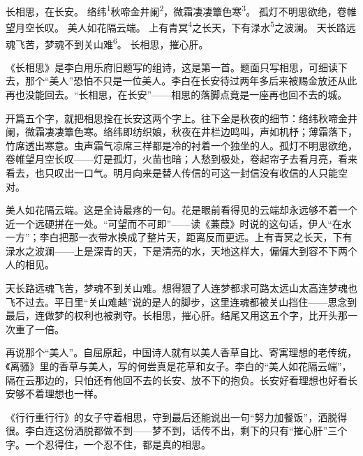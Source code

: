 
\begin{poem}
长相思，在长安。
络纬\textsuperscript{1}秋啼金井阑\textsuperscript{2}，微霜凄凄簟色寒\textsuperscript{3}。
孤灯不明思欲绝，卷帷望月空长叹。
美人如花隔云端。
上有青冥\textsuperscript{4}之长天，下有渌水\textsuperscript{5}之波澜。
天长路远魂飞苦，梦魂不到关山难\textsuperscript{6}。
长相思，摧心肝。
\end{poem}

\begin{annotations}
\end{annotations}

\begin{appreciation}
《长相思》是李白用乐府旧题写的组诗，这是第一首。题面只写相思，可细读下去，那个“美人”恐怕不只是一位美人。李白在长安待过两年多后来被赐金放还从此再也没能回去。“长相思，在长安”——相思的落脚点竟是一座再也回不去的城。

开篇五个字，就把相思拴在长安这两个字上。往下全是秋夜的细节：络纬秋啼金井阑，微霜凄凄簟色寒。络纬即纺织娘，秋夜在井栏边鸣叫，声如机杼；薄霜落下，竹席透出寒意。虫声霜气凉席三样都是冷的衬着一个独坐的人。孤灯不明思欲绝，卷帷望月空长叹——灯是孤灯，火苗也暗；人愁到极处，卷起帘子去看月亮，看来看去，也只叹出一口气。明月向来是替人传信的可这一封信没有收信的人只能空对。

美人如花隔云端。这是全诗最疼的一句。花是眼前看得见的云端却永远够不着一个近一个远硬拼在一处。“可望而不可即”——读《蒹葭》时说的这句话，伊人“在水一方”；李白把那一衣带水换成了整片天，距离反而更远。上有青冥之长天，下有渌水之波澜——上是深青的天，下是清亮的水，天地这样大，偏偏大到容不下两个人的相见。

天长路远魂飞苦，梦魂不到关山难。想得狠了人连梦都求可路太远山太高连梦魂也飞不过去。平日里“关山难越”说的是人的脚步，这里连魂都被关山挡住——思念到最后，连做梦的权利也被剥夺。长相思，摧心肝。结尾又用这五个字，比开头那一次重了一倍。

再说那个“美人”。自屈原起，中国诗人就有以美人香草自比、寄寓理想的老传统，《离骚》里的香草与美人，写的何尝真是花草和女子。李白的“美人如花隔云端”，隔在云那边的，只怕还有他回不去的长安、放不下的抱负。长安好看理想也好看长安够不着理想也一样。

《行行重行行》的女子守着相思，守到最后还能说出一句“努力加餐饭”，洒脱得很。李白连这份洒脱都做不到——梦不到，话传不出，剩下的只有“摧心肝”三个字。一个忍得住，一个忍不住，都是真的相思。
\end{appreciation}
